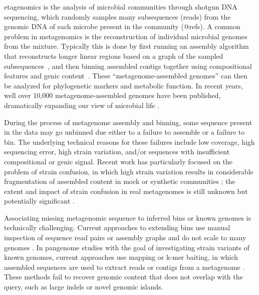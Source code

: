 etagenomics is the analysis of microbial communities through shotgun
DNA sequencing, which randomly samples many subsequences (reads)
from the genomic DNA of each microbe present in the community (@refs).
A common problem in metagenomics is the reconstruction of
individual microbial genomes from the mixture.
Typically this is
done by first running an assembly algorithm that reconstructs
longer linear regions based on a graph of the sampled
subsequences~\cite{pell2012scaling}, and then binning assembled
contigs together using compositional features and genic content~\cite{laczny2017busybee,lin2016accurate}.  These
``metagenome-assembled genomes'' can then be
analyzed for phylogenetic markers and metabolic function. In recent years,
well over 10,000 metagenome-assembled genomes have been published,
dramatically expanding our view of microbial life
\cite{Parks2017,Tully2018,Stewart2018,Delmont2018,Hug2016}.

During the process of metagenome assembly and binning, some
sequence present in the data may go unbinned due either to a failure
to assemble \cite{CAMI,Awad155358} or a failure to bin.
The underlying technical reasons for these failures include low
coverage, high sequencing error, high strain variation, and/or sequences
with insufficient compositional or genic signal.  Recent work has
particularly focused on the problem of strain confusion, in which
high strain variation results in considerable fragmentation of assembled
content in mock or synthetic communities \cite{CAMI,Awad155358}; the
extent and impact of strain confusion in real metagenomes is still unknown
but potentially significant \cite{brownstrain,Brito2016,baltic}.

Associating missing metagenomic sequence to inferred bins or known
genomes is technically challenging.  Current approaches to extending
bins use manual inspection of sequence read pairs or assembly graphs
and do not scale to many
genomes \cite{perchlorate,metacherchant}. In pangenome studies with the
goal of investigating strain variants of known genomes,
 current approaches use mapping or k-mer baiting, in which
assembled sequences are used to extract reads or contigs from a
metagenome \cite{desman,Nayfach2016,ekg,mspminer}.
These methods fail to recover genomic content that does not overlap with
the query, such as large indels or novel genomic islands.

